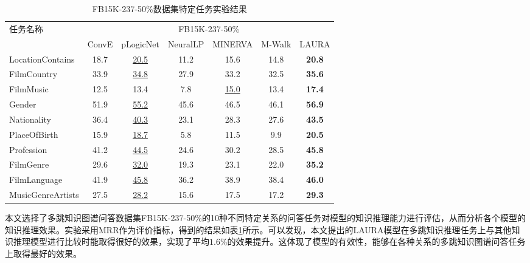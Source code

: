 \documentclass[algorithmlist, AutoFakeBold, AutoFakeSlant, figurelist, tablelist, nomlist, engineering]{seuthesix}
\begin{document}
\begin{table}[t]
  \centering
  \caption{FB15K-237-50\%数据集特定任务实验结果}
  \begin{tabular*}{1\textwidth}{@{\extracolsep{\fill}}lcccccc}
    \toprule[1pt]
    \multirow{2}{*}{任务名称} & \multicolumn{6}{c}{FB15K-237-50\%} \\
      & ConvE & pLogicNet & NeuralLP & MINERVA & M-Walk & LAURA \\ \hline
    LocationContains & 18.7 & \underline{20.5} & 11.2 & 15.6 & 14.8 & \textbf{20.8} \\
    FilmCountry & 33.9 & \underline{34.8} & 27.9 & 33.2 & 32.5 & \textbf{35.6} \\
    FilmMusic & 12.5 & 13.4 & 7.8 & \underline{15.0} & 13.4 & \textbf{17.4} \\
    Gender & 51.9 & \underline{55.2} & 45.6 & 46.5 & 46.1 & \textbf{56.9} \\
    Nationality & 36.4 & \underline{40.3} & 23.1 & 28.3 & 27.6 & \textbf{43.5} \\
    PlaceOfBirth & 15.9 & \underline{18.7} & 5.8 & 11.5 & 9.9 & \textbf{20.5} \\
    Profession & 41.2 & \underline{44.5} & 24.6 & 30.2 & 28.5 & \textbf{45.8} \\
    FilmGenre & 29.6 & \underline{32.0} & 19.3 & 23.1 & 22.0 & \textbf{35.2} \\
    FilmLanguage & 41.9 & \underline{45.8} & 36.2 & 38.9 & 38.4 & \textbf{46.0} \\
    MusicGenreArtists & 27.5 & \underline{28.2} & 15.6 & 17.5 & 17.2 & \textbf{29.3} \\
    \bottomrule[1pt]
  \end{tabular*}
  \label{Experiment2_tasks}
\end{table}

本文选择了多跳知识图谱问答数据集FB15K-237-50\%的10种不同特定关系的问答任务对模型的知识推理能力进行评估，从而分析各个模型的知识推理效果。实验采用MRR作为评价指标，得到的结果如表\ref{Experiment2_tasks}所示。可以发现，本文提出的LAURA模型在多跳知识推理任务上与其他知识推理模型进行比较时能取得很好的效果，实现了平均$1.6\%$的效果提升。这体现了模型的有效性，能够在各种关系的多跳知识图谱问答任务上取得最好的效果。
\end{document}
